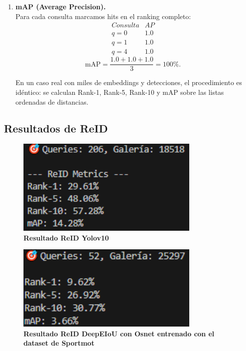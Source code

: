 \documentclass[12pt, a4paper, twoside]{article}
\begin{document}
\begin{enumerate}
 		\item \textbf{mAP (Average Precision).}\\
 		Para cada consulta marcamos hits en el ranking completo:
 		\[
 		\begin{array}{l|c}
 			Consulta & AP \\ \hline
 			q=0 & 1.0 \\
 			q=1 & 1.0 \\
 			q=4 & 1.0
 		\end{array}
 		\]
 		\[
 		\mathrm{mAP} = \frac{1.0 + 1.0 + 1.0}{3} = 100\%.
 		\]
 		
 		En un caso real con miles de embeddings y detecciones, el procedimiento es idéntico: 
 		se calculan Rank-1, Rank-5, Rank-10 y mAP sobre las listas ordenadas de distancias.
 	\end{enumerate}
 	
 	\subsection{Resultados de ReID}
 	
 	\begin{figure}[H]
 		\centering
 		\includegraphics[width=0.8\textwidth]{image/metricas_reid_yolo10}
 		\caption{\textbf{Resultado ReID Yolov10}}
 		\label{fig:Resultado Yolov10 reid}
 	\end{figure}
 	
 	\begin{figure}[H]
 		\centering
 		\includegraphics[width=0.8\textwidth]{image/metricas_reid_deepEIoU_osnet_sportsmot}
 		\caption{\textbf{Resultado ReID DeepEIoU con Osnet entrenado con el dataset de Sportmot}}
 		\label{fig:Resultado DeepEIoU con Osnet reid sportsmot}
 	\end{figure}
 	
\end{document}
